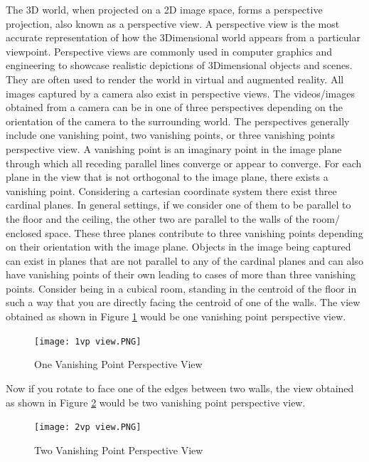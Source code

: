 \documentclass[12pt]{report}
\begin{document}
The 3D world, when projected on a 2D image space, forms a perspective projection, also known as a perspective view. A perspective view is the most accurate representation of how the 3Dimensional world appears from a particular viewpoint. Perspective views are commonly used in computer graphics and engineering to showcase realistic depictions of 3Dimensional objects and scenes. They are often used to render the world in virtual and augmented reality. All images captured by a camera also exist in perspective views. The videos/images obtained from a camera can be in one of three perspectives depending on the orientation of the camera to the surrounding world. The perspectives generally include one vanishing point, two vanishing points, or three vanishing points perspective view. A vanishing point is an imaginary point in the image plane through which all receding parallel lines converge or appear to converge. For each plane in the view that is not orthogonal to the image plane, there exists a vanishing point. Considering a cartesian coordinate system there exist three cardinal planes. In general settings, if we consider one of them to be parallel to the floor and the ceiling, the other two are parallel to the walls of the room/ enclosed space. These three planes contribute to three vanishing points depending on their orientation with the image plane. Objects in the image being captured can exist in planes that are not parallel to any of the cardinal planes and can also have vanishing points of their own leading to cases of more than three vanishing points. Consider being in a cubical room, standing in the centroid of the floor in such a way that you are directly facing the centroid of one of the walls. The view obtained as shown in Figure \ref{fig: One Vanishing point perspective view} would be one vanishing point perspective view.\newline

\begin{figure}[H]
    \centering
    \texttt{[image: 1vp view.PNG]}
    \caption{One Vanishing Point Perspective View}
    \label{fig: One Vanishing point perspective view}
\end{figure}

Now if you rotate to face one of the edges between two walls, the view obtained as shown in Figure \ref{fig: Two Vanishing point perspective view} would be two vanishing point perspective view.\newline

\begin{figure}[H]
    \centering
    \texttt{[image: 2vp view.PNG]}
    \caption{Two Vanishing Point Perspective View}
    \label{fig: Two Vanishing point perspective view}
\end{figure}
\end{document}
